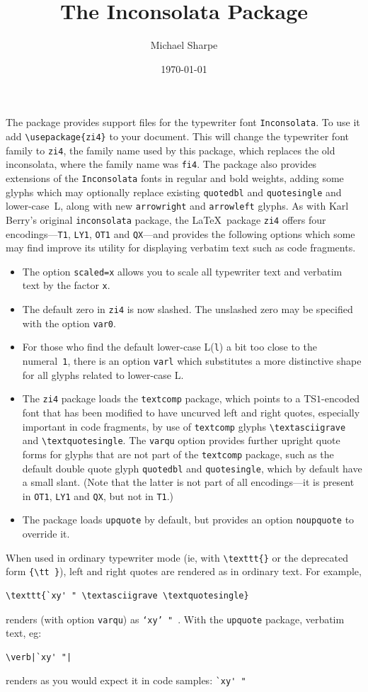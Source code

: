 \documentclass[11pt]{article}
\title{The Inconsolata  Package}
\author{Michael Sharpe}
\date{\today}  %
\begin{document}
\maketitle
The package provides support files for the typewriter font
\texttt{Inconsolata}. To use it add \verb|\usepackage{zi4}| to your document. This
will change the typewriter font family to \texttt{zi4}, the family name used
by this package, which replaces the old \textsf{inconsolata}, where the family name was \texttt{fi4}. The package also provides extensions of the \texttt{Inconsolata} fonts in regular and bold weights, adding some glyphs which may optionally replace existing \texttt{quotedbl} and \texttt{quotesingle} and lower-case~L, along with new \texttt{arrowright} and \texttt{arrowleft} glyphs. As with Karl Berry's original \texttt{inconsolata} package, the \LaTeX\ package \texttt{zi4} offers four encodings---\texttt{T1}, \texttt{LY1}, \texttt{OT1} and \texttt{QX}---and provides the following options which some may find improve its utility for displaying verbatim text such as code fragments. 
\begin{itemize}
\item The option \texttt{scaled=x} allows you to scale all typewriter text and verbatim text by the factor \texttt{x}.
\item
The default zero in \texttt{zi4} is now slashed. The unslashed zero may be specified with the option \texttt{var0}.
\item For those who find the default lower-case L(\texttt{l}) a bit too close to the numeral~\texttt{1}, there is an option \texttt{varl} which substitutes a more distinctive shape for all glyphs related to lower-case L.
\item The \texttt{zi4} package loads the \texttt{textcomp} package, which points to a TS$1$-encoded font that has been modified to have uncurved left and right quotes, especially important in code fragments, by use of \texttt{textcomp} glyphs \verb|\textasciigrave| and \verb|\textquotesingle|. The \texttt{varqu} option provides further upright quote forms for glyphs that are not part of the \texttt{textcomp} package, such as 
the default double quote glyph \texttt{quotedbl} and \texttt{quotesingle}, which by default have a small slant. (Note that the latter is not part of all encodings---it is present in \texttt{OT1}, \texttt{LY1} and \texttt{QX}, but not in \texttt{T1}.)
\item The package loads \texttt{upquote} by default, but provides an option \texttt{noupquote} to override it.
\end{itemize}
When used in ordinary typewriter mode (ie, with \verb|\texttt{}| or the deprecated form \verb|{\tt }|), left and right quotes are rendered as in ordinary text. For example, 
\begin{verbatim}
\texttt{`xy' " \textasciigrave \textquotesingle}
\end{verbatim}
renders (with option \texttt{varqu}) as \texttt{`xy' " \textasciigrave \textquotesingle}. With the \texttt{upquote} package, verbatim text, eg:
\begin{verbatim}
\verb|`xy' "|
\end{verbatim}
 renders as you would expect it in code samples:
\verb|`xy' "|
\end{document}
